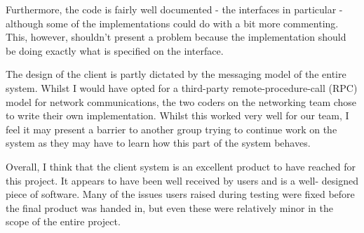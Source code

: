 Furthermore, the code is fairly well documented - the interfaces in particular
- although some of the implementations could do with a bit more commenting. 
This, however, shouldn't present a problem because the implementation should be
doing exactly what is specified on the interface.

The design of the client is partly dictated by the messaging model of the
entire system. Whilst I would have opted for a third-party remote-procedure-call
(RPC) model for network communications, the two coders on the networking team
chose to write their own implementation. Whilst this worked very well for our
team, I feel it may present a barrier to another group trying to continue work
on the system as they may have to learn how this part of the system behaves.

Overall, I think that the client system is an excellent product to have reached
for this project. It appears to have been well received by users and is a well-
designed piece of software. Many of the issues users raised during testing were
fixed before the final product was handed in, but even these were relatively
minor in the scope of the entire project.